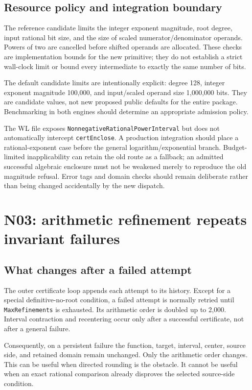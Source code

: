 \documentclass[11pt,a4paper]{article}
\newcommand{\code}[1]{\nolinkurl{#1}}
\begin{document}
\subsection{Resource policy and integration boundary}

The reference candidate limits the integer exponent magnitude, root degree, input rational bit size, and the size of scaled numerator/denominator operands. Powers of two are cancelled before shifted operands are allocated. These checks are implementation bounds for the new primitive; they do not establish a strict wall-clock limit or bound every intermediate to exactly the same number of bits.

The default candidate limits are intentionally explicit: degree 128, integer exponent magnitude 100,000, and input/scaled operand size 1,000,000 bits. They are candidate values, not new proposed public defaults for the entire package. Benchmarking in both engines should determine an appropriate admission policy.

The WL file exposes \code{NonnegativeRationalPowerInterval} but does not automatically intercept \code{certEnclose}. A production integration should place a rational-exponent case before the general logarithm/exponential branch. Budget-limited inapplicability can retain the old route as a fallback; an admitted successful algebraic enclosure must not be weakened merely to reproduce the old magnitude refusal. Error tags and domain checks should remain deliberate rather than being changed accidentally by the new dispatch.

\section{N03: arithmetic refinement repeats invariant failures}
\subsection{What changes after a failed attempt}

The outer certificate loop appends each attempt to its history. Except for a special definitive-no-root condition, a failed attempt is normally retried until \code{MaxRefinements} is exhausted. Its arithmetic order is doubled up to 2,000. Interval contraction and recentering occur only after a successful certificate, not after a general failure.\cite{cert}

Consequently, on a persistent failure the function, target, interval, center, source side, and retained domain remain unchanged. Only the arithmetic order changes. This can be useful when directed rounding is the obstacle. It cannot be useful when an exact rational comparison already disproves the selected source-side condition.
\end{document}
